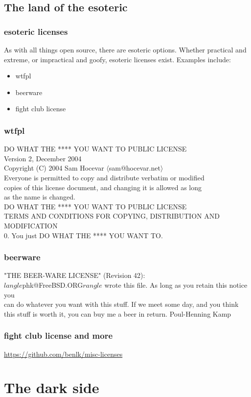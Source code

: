 \documentclass{beamer}
\begin{document}
	\subsection{The land of the esoteric}
	\begin{frame}
		\frametitle{esoteric licenses}
		As with all things open source, there are esoteric options. Whether practical and extreme, or impractical and goofy, esoteric licenses exist. Examples include:
		\pause
		\begin{itemize}[<+->]
			\item wtfpl
			\item beerware
			\item fight club license
		\end{itemize}
	\end{frame}
	\begin{frame}
		\frametitle{wtfpl}
		DO WHAT THE **** YOU WANT TO PUBLIC LICENSE\\
		Version 2, December 2004\\
		Copyright (C) 2004 Sam Hocevar $\langle$sam@hocevar.net$\rangle$\\
		Everyone is permitted to copy and distribute verbatim or modified\\
		copies of this license document, and changing it is allowed as long\\
		as the name is changed.\\
		DO WHAT THE **** YOU WANT TO PUBLIC LICENSE\\
		TERMS AND CONDITIONS FOR COPYING, DISTRIBUTION AND MODIFICATION\\
		0. You just DO WHAT THE **** YOU WANT TO.\\
	\end{frame}
	\begin{frame}
		\frametitle{beerware}
		"THE BEER-WARE LICENSE" (Revision 42):\\
		$langle$phk@FreeBSD.ORG$rangle$ wrote this file. As long as you retain this notice you\\
		can do whatever you want with this stuff. If we meet some day, and you think\\
		this stuff is worth it, you can buy me a beer in return.   Poul-Henning Kamp\\
	\end{frame}
	\begin{frame}
		\frametitle{fight club license and more}
		\center\url{https://github.com/benlk/misc-licenses}
	\end{frame}
	\section{The dark side}
\end{document}
